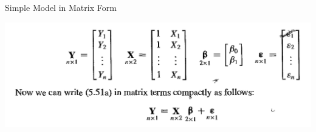 \documentclass[
  ignorenonframetext,
]{beamer}
\begin{document}
\begin{frame}{Simple Model in Matrix Form}
\protect\hypertarget{simple-model-in-matrix-form}{}

\begin{center}\includegraphics[width=1\linewidth]{resources/Class 02 - mm regression} \end{center}

\end{frame}
\end{document}
